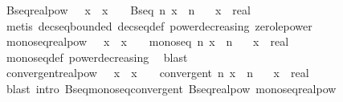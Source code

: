 \begin{isabellebody}
%
\isamarkuptrue%
%
\endisatagdocument
{\isafolddocument}%
%
\isadelimdocument
%
\endisadelimdocument
{}\isamarkupfalse%
\ Bseq{\isacharunderscore}{\kern0pt}realpow{\isacharcolon}{\kern0pt}\ {\isachardoublequoteopen}{}\ {\isasymle}\ x\ {\isasymLongrightarrow}\ x\ {\isasymle}\ {}\ {\isasymLongrightarrow}\ Bseq\ {\isacharparenleft}{\kern0pt}{\isasymlambda}n{\isachardot}{\kern0pt}\ x\ {\isacharcircum}{\kern0pt}\ n{\isacharparenright}{\kern0pt}{\isachardoublequoteclose}\isanewline
\ \ \ x\ {\isacharcolon}{\kern0pt}{\isacharcolon}{\kern0pt}\ real\isanewline
%
\isadelimproof
\ \ %
\endisadelimproof
%
\isatagproof
{}\isamarkupfalse%
\ {\isacharparenleft}{\kern0pt}metis\ decseq{\isacharunderscore}{\kern0pt}bounded\ decseq{\isacharunderscore}{\kern0pt}def\ power{\isacharunderscore}{\kern0pt}decreasing\ zero{\isacharunderscore}{\kern0pt}le{\isacharunderscore}{\kern0pt}power{\isacharparenright}{\kern0pt}%
\endisatagproof
{\isafoldproof}%
%
\isadelimproof
\isanewline
%
\endisadelimproof
\isanewline
{}\isamarkupfalse%
\ monoseq{\isacharunderscore}{\kern0pt}realpow{\isacharcolon}{\kern0pt}\ {\isachardoublequoteopen}{}\ {\isasymle}\ x\ {\isasymLongrightarrow}\ x\ {\isasymle}\ {}\ {\isasymLongrightarrow}\ monoseq\ {\isacharparenleft}{\kern0pt}{\isasymlambda}n{\isachardot}{\kern0pt}\ x\ {\isacharcircum}{\kern0pt}\ n{\isacharparenright}{\kern0pt}{\isachardoublequoteclose}\isanewline
\ \ \ x\ {\isacharcolon}{\kern0pt}{\isacharcolon}{\kern0pt}\ real\isanewline
%
\isadelimproof
\ \ %
\endisadelimproof
%
\isatagproof
{}\isamarkupfalse%
\ monoseq{\isacharunderscore}{\kern0pt}def\ power{\isacharunderscore}{\kern0pt}decreasing\ \isamarkupfalse%
\ blast%
\endisatagproof
{\isafoldproof}%
%
\isadelimproof
\isanewline
%
\endisadelimproof
\isanewline
{}\isamarkupfalse%
\ convergent{\isacharunderscore}{\kern0pt}realpow{\isacharcolon}{\kern0pt}\ {\isachardoublequoteopen}{}\ {\isasymle}\ x\ {\isasymLongrightarrow}\ x\ {\isasymle}\ {}\ {\isasymLongrightarrow}\ convergent\ {\isacharparenleft}{\kern0pt}{\isasymlambda}n{\isachardot}{\kern0pt}\ x\ {\isacharcircum}{\kern0pt}\ n{\isacharparenright}{\kern0pt}{\isachardoublequoteclose}\isanewline
\ \ \ x\ {\isacharcolon}{\kern0pt}{\isacharcolon}{\kern0pt}\ real\isanewline
%
\isadelimproof
\ \ %
\endisadelimproof
%
\isatagproof
{}\isamarkupfalse%
\ {\isacharparenleft}{\kern0pt}blast\ intro{\isacharbang}{\kern0pt}{\isacharcolon}{\kern0pt}\ Bseq{\isacharunderscore}{\kern0pt}monoseq{\isacharunderscore}{\kern0pt}convergent\ Bseq{\isacharunderscore}{\kern0pt}realpow\ monoseq{\isacharunderscore}{\kern0pt}realpow{\isacharparenright}{\kern0pt}%

\end{isabellebody}

